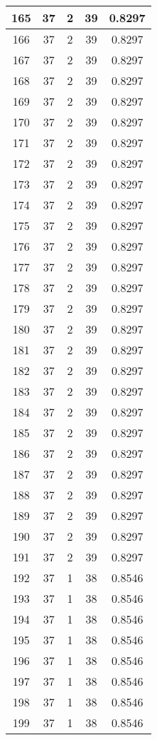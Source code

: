 \documentclass[letterpaper, 12pt]{article}
\begin{document}
\begin{longtable}{|c|c|c|c|c|}
\hline
165 & 37 & 2 & 39 & 0.8297 \\
\hline
166 & 37 & 2 & 39 & 0.8297 \\
\hline
167 & 37 & 2 & 39 & 0.8297 \\
\hline
168 & 37 & 2 & 39 & 0.8297 \\
\hline
169 & 37 & 2 & 39 & 0.8297 \\
\hline
170 & 37 & 2 & 39 & 0.8297 \\
\hline
171 & 37 & 2 & 39 & 0.8297 \\
\hline
172 & 37 & 2 & 39 & 0.8297 \\
\hline
173 & 37 & 2 & 39 & 0.8297 \\
\hline
174 & 37 & 2 & 39 & 0.8297 \\
\hline
175 & 37 & 2 & 39 & 0.8297 \\
\hline
176 & 37 & 2 & 39 & 0.8297 \\
\hline
177 & 37 & 2 & 39 & 0.8297 \\
\hline
178 & 37 & 2 & 39 & 0.8297 \\
\hline
179 & 37 & 2 & 39 & 0.8297 \\
\hline
180 & 37 & 2 & 39 & 0.8297 \\
\hline
181 & 37 & 2 & 39 & 0.8297 \\
\hline
182 & 37 & 2 & 39 & 0.8297 \\
\hline
183 & 37 & 2 & 39 & 0.8297 \\
\hline
184 & 37 & 2 & 39 & 0.8297 \\
\hline
185 & 37 & 2 & 39 & 0.8297 \\
\hline
186 & 37 & 2 & 39 & 0.8297 \\
\hline
187 & 37 & 2 & 39 & 0.8297 \\
\hline
188 & 37 & 2 & 39 & 0.8297 \\
\hline
189 & 37 & 2 & 39 & 0.8297 \\
\hline
190 & 37 & 2 & 39 & 0.8297 \\
\hline
191 & 37 & 2 & 39 & 0.8297 \\
\hline
192 & 37 & 1 & 38 & 0.8546 \\
\hline
193 & 37 & 1 & 38 & 0.8546 \\
\hline
194 & 37 & 1 & 38 & 0.8546 \\
\hline
195 & 37 & 1 & 38 & 0.8546 \\
\hline
196 & 37 & 1 & 38 & 0.8546 \\
\hline
197 & 37 & 1 & 38 & 0.8546 \\
\hline
198 & 37 & 1 & 38 & 0.8546 \\
\hline
199 & 37 & 1 & 38 & 0.8546 \\
\hline
\end{longtable}
\end{document}

